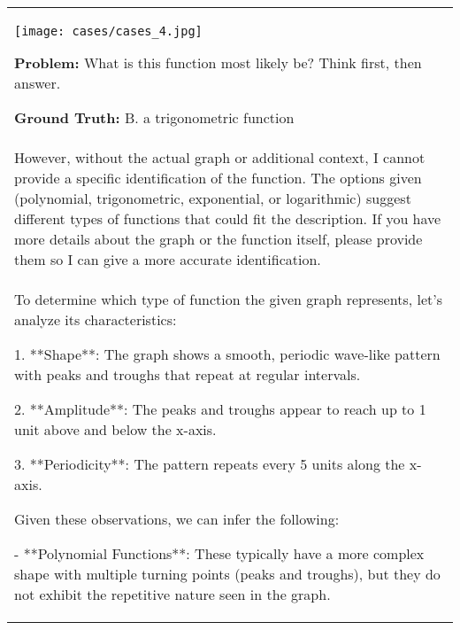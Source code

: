 \begin{table*}[htbp]
    \centering
    \renewcommand{\arraystretch}{1.2} 
    \setlength{\tabcolsep}{8pt} 
    \begin{tabular}{p{14cm}}
        \centering
        \texttt{[image: cases/cases\_4.jpg]}
        
        \begin{tcolorbox}[colback=gray!5, colframe=gray!40, sharp corners, width=\linewidth, boxrule=0.5mm]
        \small
        \textbf{Problem: }
        What is this function most likely be? Think first, then answer.

        \textbf{Ground Truth:} B. a trigonometric function
        \end{tcolorbox}  %
        \begin{tcolorbox}[colback=gray!5, colframe=gray!40, sharp corners, width=\linewidth, boxrule=0.5mm]
            \small
            \textbf{$\alpha=0.8$:}
            \\
However, without the actual graph or additional context, I cannot provide a specific identification of the function. The options given (polynomial, trigonometric, exponential, or logarithmic) suggest different types of functions that could fit the description. If you have more details about the graph or the function itself, please provide them so I can give a more accurate identification.


        \end{tcolorbox}
        

        \begin{tcolorbox}[colback=gray!5, colframe=gray!40, sharp corners, width=\linewidth, boxrule=0.5mm]
        \small
        \textbf{$\alpha=0.9$:}
        \\
To determine which type of function the given graph represents, let's analyze its characteristics:

1. **Shape**: The graph shows a smooth, periodic wave-like pattern with peaks and troughs that repeat at regular intervals.

2. **Amplitude**: The peaks and troughs appear to reach up to 1 unit above and below the x-axis.

3. **Periodicity**: The pattern repeats every 5 units along the x-axis.

Given these observations, we can infer the following:

- **Polynomial Functions**: These typically have a more complex shape with multiple turning points (peaks and troughs), but they do not exhibit the repetitive nature seen in the graph.


\end{tcolorbox}
\end{tabular}
\end{table*}
